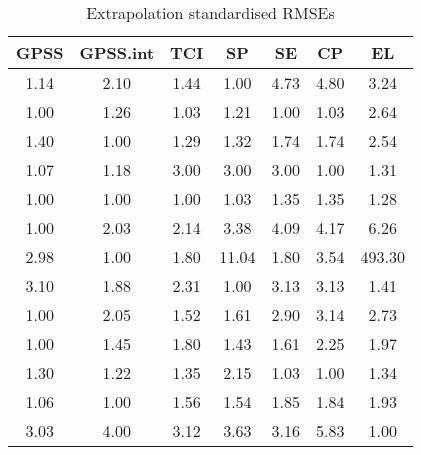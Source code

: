 \documentclass{article}
\begin{document}
\begin{table}
\begin{tabular}{|c|c|c|c|c|c|c|}
\hline
GPSS & GPSS.int & TCI & SP & SE & CP & EL \\
\hline
1.14 & 2.10 & 1.44 & 1.00 & 4.73 & 4.80 & 3.24\\
1.00 & 1.26 & 1.03 & 1.21 & 1.00 & 1.03 & 2.64\\
1.40 & 1.00 & 1.29 & 1.32 & 1.74 & 1.74 & 2.54\\
1.07 & 1.18 & 3.00 & 3.00 & 3.00 & 1.00 & 1.31\\
1.00 & 1.00 & 1.00 & 1.03 & 1.35 & 1.35 & 1.28\\
1.00 & 2.03 & 2.14 & 3.38 & 4.09 & 4.17 & 6.26\\
2.98 & 1.00 & 1.80 & 11.04 & 1.80 & 3.54 & 493.30\\
3.10 & 1.88 & 2.31 & 1.00 & 3.13 & 3.13 & 1.41\\
1.00 & 2.05 & 1.52 & 1.61 & 2.90 & 3.14 & 2.73\\
1.00 & 1.45 & 1.80 & 1.43 & 1.61 & 2.25 & 1.97\\
1.30 & 1.22 & 1.35 & 2.15 & 1.03 & 1.00 & 1.34\\
1.06 & 1.00 & 1.56 & 1.54 & 1.85 & 1.84 & 1.93\\
3.03 & 4.00 & 3.12 & 3.63 & 3.16 & 5.83 & 1.00\\
\hline
\end{tabular}
\caption{Extrapolation standardised RMSEs}
\end{table}
\end{document}
